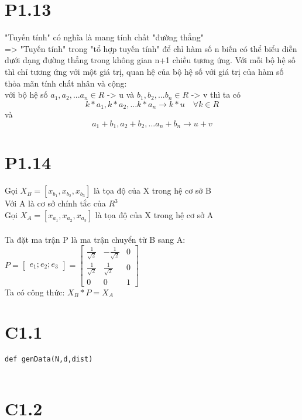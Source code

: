\documentclass[a4paper,11pt]{article}
\theoremstyle{mytheor}
\begin{document}
\section*{P1.13}
"Tuyến tính" có nghĩa là mang tính chất "đường thẳng"\\
=> "Tuyến tính" trong "tổ hợp tuyến tính" để chỉ hàm số n biến có thể biểu diễn dưới dạng đường thẳng trong không gian n+1 chiều tương ứng. Với mỗi bộ hệ số thì chỉ tương ứng với một giá trị, quan hệ của bộ hệ số với giá trị của hàm số thỏa mãn tính chất nhân và cộng:
\\
với bộ hệ số $a_1,a_2,...a_n \in R$ -> u và $b_1,b_2,...b_n \in R$ -> v thì ta có
$$
    k*a_1,k*a_2,...k*a_n \rightarrow k*u \quad \forall k \in R
$$
và
$$
    a_1+b_1,a_2+b_2,... a_n+b_n \rightarrow u+v
$$
\section*{P1.14}
Gọi $X_B = [x_{b_1},x_{b_2},x_{b_3}] $ là tọa độ của X trong hệ cơ sở B\\
Với A là cơ sở chính tắc của $R^3$\\
Gọi $X_A = [x_{a_1},x_{a_2},x_{a_3}] $ là tọa độ của X trong hệ cơ sở A\\
\\
Ta đặt ma trận P là ma trận chuyển từ B sang A:\\
$   P = \begin{bmatrix}
        e_1;e_2;e_3
        \end{bmatrix}
    = \begin{bmatrix}
        \frac{1}{\sqrt{2}} & -\frac{1}{\sqrt{2}} & 0\\
        \frac{1}{\sqrt{2}} & \frac{1}{\sqrt{2}} & 0\\
        0 & 0 & 1
        \end{bmatrix}
$\\
Ta có công thức:
$X_B * P = X_A $
\section*{C1.1}

\begin{lstlisting}[label={list:first},caption={sample = genData(N,d,'dist')}]
def genData(N,d,dist)
    
\end{lstlisting}

\section*{C1.2}
\end{document}
